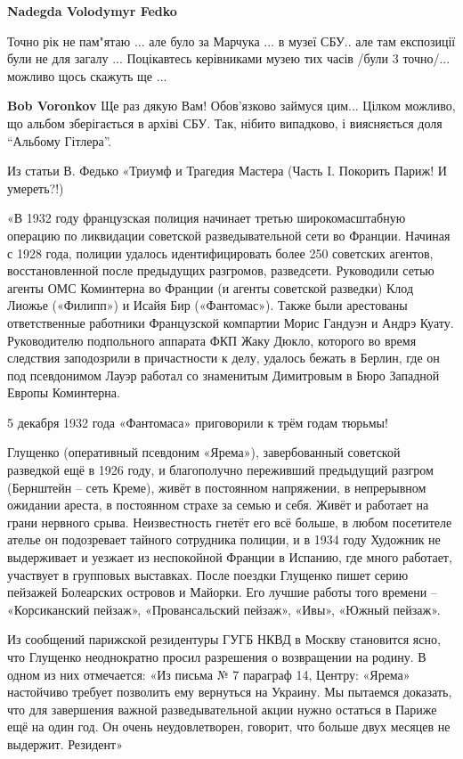 \begin{itemize}
\begin{itemize}
\begin{itemize}
\textbf{Nadegda Volodymyr Fedko} 

Точно рік не пам"ятаю ... але було за Марчука ... в музеї СБУ.. але там
експозиції були не для загалу ... Поцікавтесь керівниками музею тих часів /були
3 точно/... можливо щось скажуть ще ...


\textbf{Bob Voronkov} Ще раз дякую Вам! Обов'язково займуся цим... Цілком можливо, що альбом зберігається в архіві СБУ.
Так, нібито випадково, і виясняється доля \enquote{Альбому Гітлера}.
\end{itemize} %

\end{itemize} %


Из статьи В. Федько «Триумф и Трагедия Мастера (Часть I. Покорить Париж! И
умереть?!)

«В 1932 году французская полиция начинает третью широкомасштабную операцию по
ликвидации советской разведывательной сети во Франции. Начиная с 1928 года,
полиции удалось идентифицировать более 250 советских агентов, восстановленной
после предыдущих разгромов, разведсети. Руководили сетью агенты ОМС Коминтерна
во Франции (и агенты советской разведки) Клод Лиожье («Филипп») и Исайя Бир
(«Фантомас»). Также были арестованы ответственные работники Французской
компартии Морис Гандуэн и Андрэ Куату. Руководителю подпольного аппарата ФКП
Жаку Дюкло, которого во время следствия заподозрили в причастности к делу,
удалось бежать в Берлин, где он под псевдонимом Лауэр работал со знаменитым
Димитровым в Бюро Западной Европы Коминтерна.

5 декабря 1932 года «Фантомаса» приговорили к трём годам тюрьмы!

Глущенко (оперативный псевдоним «Ярема»), завербованный советской разведкой ещё
в 1926 году, и благополучно переживший предыдущий разгром (Бернштейн – сеть
Креме), живёт в постоянном напряжении, в непрерывном ожидании ареста, в
постоянном страхе за семью и себя. Живёт и работает на грани нервного срыва.
Неизвестность гнетёт его всё больше, в любом посетителе ателье он подозревает
тайного сотрудника полиции, и в 1934 году Художник не выдерживает и уезжает из
неспокойной Франции в Испанию, где много работает, участвует в групповых
выставках. После поездки Глущенко пишет серию пейзажей Болеарских островов и
Майорки. Его лучшие работы того времени – «Корсиканский пейзаж»,
«Провансальский пейзаж», «Ивы», «Южный пейзаж».

Из сообщений парижской резидентуры ГУГБ НКВД в Москву становится ясно, что
Глущенко неоднократно просил разрешения о возвращении на родину. В одном из них
отмечается: «Из письма № 7 параграф 14, Центру: «Ярема» настойчиво требует
позволить ему вернуться на Украину. Мы пытаемся доказать, что для завершения
важной разведывательной акции нужно остаться в Париже ещё на один год. Он очень
неудовлетворен, говорит, что больше двух месяцев не выдержит. Резидент»


\end{itemize}
